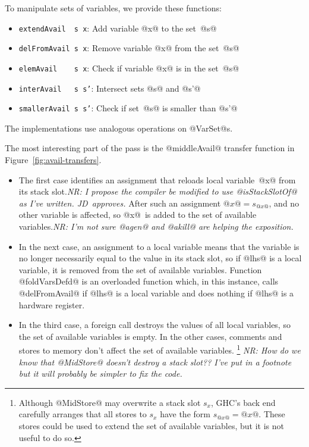 \documentclass[blockstyle,preprint,nocopyrightspace]{sigplanconf}
\newcommand\slotof[1]{\ensuremath{s_{#1}}}
\newcommand{\authornote}[1]{{\em #1}}
\newcommand{\norman}[1]{\authornote{NR: #1}}
\let\remark\norman
\newcommand{\john}[1]{\authornote{JD: #1}}
\newcommand\figref[1]{Figure~\ref{fig:#1}}
\begin{document}
To manipulate sets of variables, we provide these functions:
\begin{itemize}
\item \texttt{extendAvail~~s~x}: Add variable @x@ to the set~@s@
\item \texttt{delFromAvail~s~x}: Remove variable @x@ from the set~@s@
\item \texttt{elemAvail~~~~s~x}: Check if variable @x@ is in the set~@s@
\item \texttt{interAvail~~~s s'}: Intersect sets @s@ and @s'@
\item \texttt{smallerAvail~s s'}: Check if set~@s@ is smaller than @s'@
\end{itemize}
The implementations use analogous operations on @VarSet@s.




The most interesting part of the pass is the @middleAvail@ transfer
function in \figref{avail-transfers}.
\begin{itemize}
\item
The first case identifies an assignment that reloads local
variable~@x@ from its stack slot.\remark{I propose the compiler be
modified to use @isStackSlotOf@ as I've written. JD~approves.}
After such an assignment $@x@ = \slotof{@x@}$, and no other variable
is affected, so @x@~is added to the set of available
variables.\remark{I'm not sure @agen@ and 
@akill@ are helping the exposition.}
\item
In the next case, an assignment to a local variable means that the
variable is no longer necessarily equal to the value in its stack
slot, so if @lhs@ is a local variable, it is removed from the set of
available variables.
Function @foldVarsDefd@ is an overloaded function which, in this
instance, calls @delFromAvail@ if @lhs@ is a local variable and does
nothing if @lhs@ is a hardware register.
\item 
In the third case, a foreign call destroys the values of all local
variables, so the set of available variables is empty.
In the other cases, comments and stores to memory don't affect the set
of available variables.
\footnote
{Although @MidStore@ may overwrite a stack slot \slotof x, GHC's back end
carefully arranges that all stores to \slotof x have the form
$\slotof{@x@}= @x@$.
These stores could be used to extend the set of available variables,
but it is not useful to do so.}
\remark{How do we know that @MidStore@ doesn't
destroy a stack slot??  I've put in a footnote but it will probably be
simpler to fix the code.}
\end{itemize}
\end{document}
